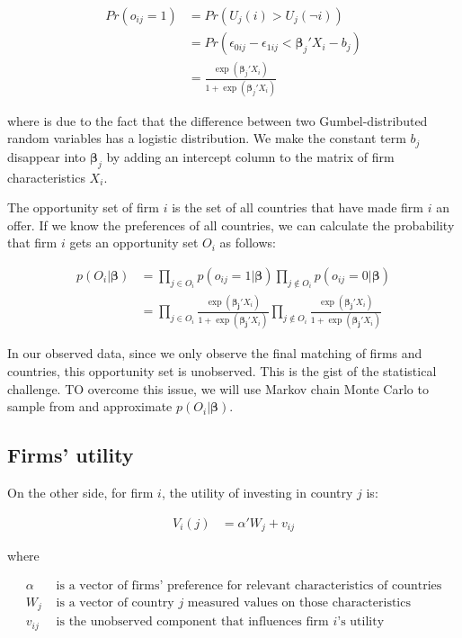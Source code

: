 \begin{align}
Pr(o_{ij} = 1) &= Pr(U_j(i) > U_j(\neg i)) \\
&= Pr(\epsilon_{0ij} - \epsilon_{1ij} <  \bm{\beta}_j ' X_i - b_j) \\
&= \frac{\exp({\bm{\beta}_j'X_i})}{1 + \exp({\bm{\beta}_j'X_i})} \label{eq:prob_offer_ij}
\end{align}

where  is due to the fact that the difference between two Gumbel-distributed random variables has a logistic distribution. We make the constant term $b_j$ disappear into $\bm{\beta}_j$ by adding an intercept column to the matrix of firm characteristics $X_i$.

The opportunity set of firm $i$ is the set of all countries that have made firm $i$ an offer. If we know the preferences of all countries, we can calculate the probability that firm $i$ gets an opportunity set $O_i$ as follows:

\begin{align}
p(O_i | \bm{\beta}) &= \prod_{j \in O_i} p(o_{ij} = 1 | \bm{\beta}) \prod_{j \notin O_i} p(o_{ij} = 0 | \bm{\beta}) \\
&= \prod_{j \in O_i} \frac{\exp(\bm{\beta_j} ' X_i)}{1 + \exp(\bm{\beta_j}' X_i)}
 \prod_{j \notin O_i} \frac{\exp(\bm{\beta_j} ' X_i)}{1 + \exp(\bm{\beta_j}' X_i)} \label{eq:conditional_probability_of_offer}
\end{align}

In our observed data, since we only observe the final matching of firms and countries, this opportunity set is unobserved. This is the gist of the statistical challenge. TO overcome this issue, we will use Markov chain Monte Carlo to sample from and approximate $p(O_i | \bm \beta)$.

\subsection{Firms' utility}

On the other side, for firm $i$, the utility of investing in country $j$ is:

\begin{align}
V_i(j) &= \alpha' W_{j} + v_{ij}
\end{align}

where

\begin{align*}
\alpha &\text{ is a vector of firms' preference for relevant characteristics of countries} \\
W_j &\text{ is a vector of country $j$ measured values on those characteristics} \\
v_{ij} &\text{ is the unobserved component that influences firm $i$'s utility}
\end{align*}

